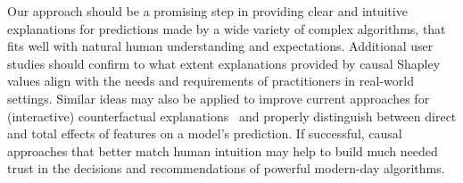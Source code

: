 \documentclass{article}
\newcommand{\comment}[1]{{\color{red} #1}}
\begin{document}
Our approach should be a promising step in providing clear and intuitive explanations for predictions made by a wide variety of complex algorithms, that fits well with natural human understanding and expectations. Additional user studies should confirm to what extent explanations provided by causal Shapley values align with the needs and requirements of practitioners in real-world settings. Similar ideas may also be applied to improve current approaches for (interactive) counterfactual explanations~\cite{wachter2017counterfactual} and properly distinguish between direct and total effects of features on a model's prediction.
If successful, causal approaches that better match human intuition may help to build much needed trust in the decisions and recommendations of powerful modern-day algorithms. 


%
%
\end{document}
